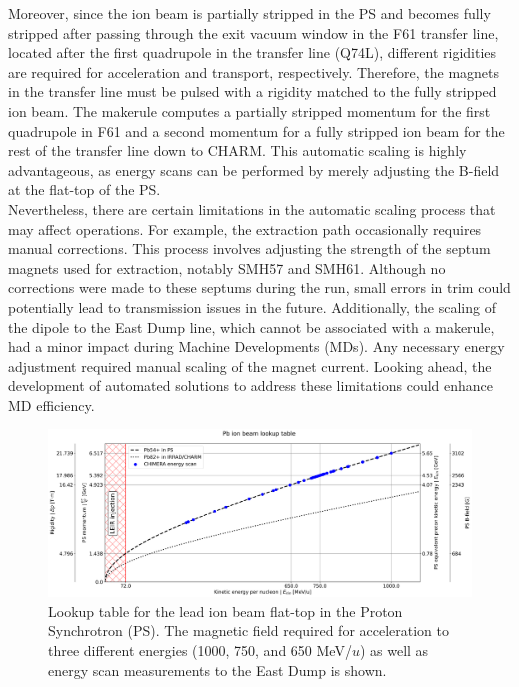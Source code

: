 \documentclass{cernatsnote}
\begin{document}
Moreover, since the ion beam is partially stripped in the PS and becomes fully stripped after passing through the exit vacuum window in the F61 transfer line, located after the first quadrupole in the transfer line (Q74L), different rigidities are required for acceleration and transport, respectively. Therefore, the magnets in the transfer line must be pulsed with a rigidity matched to the fully stripped ion beam. The makerule computes a partially stripped momentum for the first quadrupole in F61 and a second momentum for a fully stripped ion beam for the rest of the transfer line down to CHARM. This automatic scaling is highly advantageous, as energy scans can be performed by merely adjusting the B-field at the flat-top of the PS.
\\

Nevertheless, there are certain limitations in the automatic scaling process that may affect operations. For example, the extraction path occasionally requires manual corrections. This process involves adjusting the strength of the septum magnets used for extraction, notably SMH57 and SMH61. Although no corrections were made to these septums during the run, small errors in trim could potentially lead to transmission issues in the future. Additionally, the scaling of the dipole to the East Dump line, which cannot be associated with a makerule, had a minor impact during Machine Developments (MDs). Any necessary energy adjustment required manual scaling of the magnet current. Looking ahead, the development of automated solutions to address these limitations could enhance MD efficiency.


\begin{figure}[!htb]
\centering
\includegraphics[width=1.0\textwidth]{images/PS_BEAM_ENERGY/kinetic_energy_lookup_chimera.png}
\caption{Lookup table for the lead ion beam flat-top in the Proton Synchrotron (PS). The magnetic field required for acceleration to three different energies (1000, 750, and 650 MeV/$u$) as well as energy scan measurements to the East Dump is shown.}
\label{fig:lookup table}
\end{figure}
\end{document}
